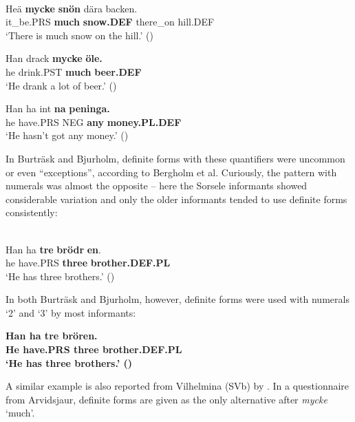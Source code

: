 \ea\label{}
\\
\gll Heä  \textbf{mycke} \textbf{snön} dära  backen.\\
it\_be.PRS  \textbf{much} \textbf{snow.DEF} there\_on  hill.DEF\\
\glt ‘There is much snow on the hill.’ (\citet[24]{BergholmEtAl1999})

\z

\ea
\gll Han  drack  \textbf{mycke} \textbf{öle.}\\
he  drink.PST  \textbf{much} \textbf{beer.DEF}\\
\glt ‘He drank a lot of beer.’ (\citet[24]{BergholmEtAl1999})

\z 

\ea
\gll Han  ha  int  \textbf{na} \textbf{peninga.}\\
he  have.PRS  NEG  \textbf{any} \textbf{money.PL.DEF}\\
\glt ‘He hasn’t got any money.’ (\citet[24]{BergholmEtAl1999})

\z

In Burträsk and Bjurholm, definite forms with these quantifiers were uncommon or even “exceptions”, according to Bergholm et al. Curiously, the pattern with numerals was almost the opposite – here the Sorsele informants showed considerable variation and only the older informants tended to use definite forms consistently:

\ea \label{} 
\\
\gll Han  ha  \textbf{tre} \textbf{brödr} \textbf{en}.\\
he  have.PRS  \textbf{three} \textbf{brother.DEF.PL}\\
\glt ‘He has three brothers.’ (\citet[24]{BergholmEtAl1999})

\z

In both Burträsk and Bjurholm, however, definite forms were used with numerals ‘2’ and ‘3’ by most informants:

\ea \label{} 
\gll \bfseries Han  ha  tre  brören.\\
\bfseries He  have.PRS  three  brother.DEF.PL\\
\glt ‘He has three brothers.’ (\citet[24]{BergholmEtAl1999})

\z

A similar example is also reported from Vilhelmina (SVb) by \citet{WälchliEtAl1998}. In a questionnaire from Arvidsjaur, definite forms are given as the only alternative after \textit{mycke} ‘much’. 

